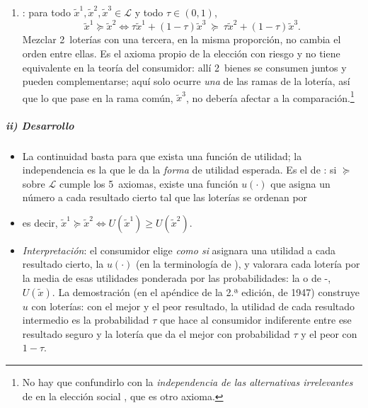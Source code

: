 \documentclass[11pt]{article}
\begin{document}
\begin{itemize}
\begin{itemize}
\begin{enumerate}
    \item {}: para todo $\tilde{x}^1,\tilde{x}^2,\tilde{x}^3\in\mathcal{L}$ y todo $\tau\in(0,1)$,
      $$\tilde{x}^1\succcurlyeq\tilde{x}^2\iff\tau\tilde{x}^1+(1-\tau)\tilde{x}^3\ \succcurlyeq\ \tau\tilde{x}^2+(1-\tau)\tilde{x}^3 .$$
      Mezclar 2~loterías con una tercera, en la misma proporción, no cambia el orden entre ellas. Es el axioma propio de la elección con riesgo y no tiene equivalente en la teoría del consumidor: allí 2~bienes se consumen juntos y pueden complementarse; aquí solo ocurre \emph{una} de las ramas de la lotería, así que lo que pase en la rama común, $\tilde{x}^3$, no debería afectar a la comparación.\footnote{No hay que confundirlo con la \emph{independencia de las alternativas irrelevantes} de  en la elección social , que es otro axioma.}
    \end{enumerate}
  \end{itemize}
\end{itemize}

\subparagraph{ii) Desarrollo}

\begin{itemize}
\item La continuidad basta para que exista una función de utilidad; la independencia es la que le da la \emph{forma} de utilidad esperada. Es el  de \textcite{VonNeumannMorgenstern1944Theory}: si $\succcurlyeq$ sobre $\mathcal{L}$ cumple los 5~axiomas, existe una función $u(\cdot)$ que asigna un número a cada resultado cierto tal que las loterías se ordenan por
\end{itemize}



\begin{itemize}
\item[] es decir, $\tilde{x}^1\succcurlyeq\tilde{x}^2\iff U(\tilde{x}^1)\geq U(\tilde{x}^2)$.
\item \emph{Interpretación}: el consumidor elige \emph{como si} asignara una utilidad a cada resultado cierto, la  $u(\cdot)$ (en la terminología de \textcite{MasColellWhinstonGreen1995}), y valorara cada lotería por la media de esas utilidades ponderada por las probabilidades: la  o de -, $U(\tilde{x})$. La demostración (en el apéndice de la 2.ª edición, de 1947) construye $u$ con loterías: con el mejor y el peor resultado, la utilidad de cada resultado intermedio es la probabilidad $\tau$ que hace al consumidor indiferente entre ese resultado seguro y la lotería que da el mejor con probabilidad $\tau$ y el peor con $1-\tau$.
\end{itemize}
\end{document}
